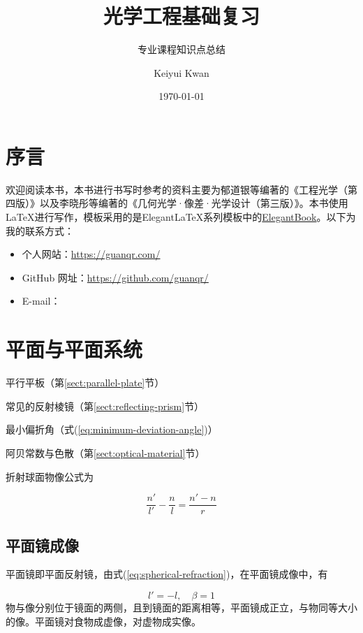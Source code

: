 \documentclass[cn,11pt]{elegantbook}
\title{光学工程基础复习}
\subtitle{专业课程知识点总结}
\author{Keiyui Kwan}
\institute{Zhejiang University}
\date{\today}
\begin{document}
	
\maketitle
\frontmatter
\tableofcontents
\mainmatter
	
\chapter*{序言}
欢迎阅读本书，本书进行书写时参考的资料主要为郁道银等编著的《工程光学（第四版）》以及李晓彤等编著的《几何光学·像差·光学设计（第三版）》。本书使用\LaTeX 进行写作，模板采用的是Elegant\LaTeX 系列模板中的\href{https://github.com/ElegantLaTeX/ElegantBook}{ElegantBook}。以下为我的联系方式：
\begin{itemize}
	\item 个人网站：\href{https://guanqr.com/}{https://guanqr.com/}
	\item GitHub 网址：\href{https://github.com/guanqr/}{https://github.com/guanqr/}
	\item E-mail：
\end{itemize}

\chapter{平面与平面系统}

\begin{introduction}
	\item 平行平板（第\ref{sect:parallel-plate}节）
	\item 常见的反射棱镜（第\ref{sect:reflecting-prism}节）
	\item 最小偏折角（式(\ref{eq:minimum-deviation-angle})）
	\item 阿贝常数与色散（第\ref{sect:optical-material}节）
\end{introduction}

折射球面物像公式为

\begin{equation}
\frac{n'}{l'}-\frac{n}{l}=\frac{n'-n}{r}
\label{eq:spherical-refraction}
\end{equation}

\section{平面镜成像}
平面镜即平面反射镜，由式(\ref{eq:spherical-refraction})，在平面镜成像中，有

\begin{equation}
l'=-l,\quad\beta=1
\end{equation}
物与像分别位于镜面的两侧，且到镜面的距离相等，平面镜成正立，与物同等大小的像。平面镜对食物成虚像，对虚物成实像。
\end{document}
